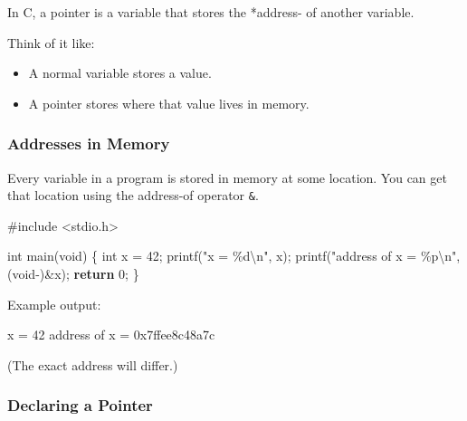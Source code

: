 \documentclass[
  letterpaper,
  DIV=11,
  numbers=noendperiod]{scrreprt}
\newenvironment{Shaded}{\begin{snugshade}}{\end{snugshade}}
\newcommand{\ControlFlowTok}[1]{\textcolor[rgb]{0.00,0.23,0.31}{\textbf{#1}}}
\newcommand{\DataTypeTok}[1]{\textcolor[rgb]{0.68,0.00,0.00}{#1}}
\newcommand{\DecValTok}[1]{\textcolor[rgb]{0.68,0.00,0.00}{#1}}
\newcommand{\ExtensionTok}[1]{\textcolor[rgb]{0.00,0.23,0.31}{#1}}
\newcommand{\ImportTok}[1]{\textcolor[rgb]{0.00,0.46,0.62}{#1}}
\newcommand{\NormalTok}[1]{\textcolor[rgb]{0.00,0.23,0.31}{#1}}
\newcommand{\OperatorTok}[1]{\textcolor[rgb]{0.37,0.37,0.37}{#1}}
\newcommand{\PreprocessorTok}[1]{\textcolor[rgb]{0.68,0.00,0.00}{#1}}
\newcommand{\SpecialCharTok}[1]{\textcolor[rgb]{0.37,0.37,0.37}{#1}}
\newcommand{\StringTok}[1]{\textcolor[rgb]{0.13,0.47,0.30}{#1}}
\providecommand{\tightlist}{%
  \setlength{\itemsep}{0pt}\setlength{\parskip}{0pt}}
\begin{document}
In C, a pointer is a variable that stores the *address- of another
variable.

Think of it like:

\begin{itemize}
\tightlist
\item
  A normal variable stores a value.
\item
  A pointer stores where that value lives in memory.
\end{itemize}

\subsubsection{Addresses in Memory}\label{addresses-in-memory}

Every variable in a program is stored in memory at some location. You
can get that location using the address-of operator \texttt{\&}.

\begin{Shaded}
\begin{Highlighting}[]
\PreprocessorTok{\#include }\ImportTok{\textless{}stdio.h\textgreater{}}

\DataTypeTok{int}\NormalTok{ main}\OperatorTok{(}\DataTypeTok{void}\OperatorTok{)} \OperatorTok{\{}
    \DataTypeTok{int}\NormalTok{ x }\OperatorTok{=} \DecValTok{42}\OperatorTok{;}
\NormalTok{    printf}\OperatorTok{(}\StringTok{"x = }\SpecialCharTok{\%d\textbackslash{}n}\StringTok{"}\OperatorTok{,}\NormalTok{ x}\OperatorTok{);}
\NormalTok{    printf}\OperatorTok{(}\StringTok{"address of x = }\SpecialCharTok{\%p\textbackslash{}n}\StringTok{"}\OperatorTok{,} \OperatorTok{(}\DataTypeTok{void}\OperatorTok{{-})\&}\NormalTok{x}\OperatorTok{);}
    \ControlFlowTok{return} \DecValTok{0}\OperatorTok{;}
\OperatorTok{\}}
\end{Highlighting}
\end{Shaded}

Example output:

\begin{Shaded}
\begin{Highlighting}[]
\ExtensionTok{x}\NormalTok{ = 42}
\ExtensionTok{address}\NormalTok{ of x = 0x7ffee8c48a7c}
\end{Highlighting}
\end{Shaded}

(The exact address will differ.)

\subsubsection{Declaring a Pointer}\label{declaring-a-pointer}
\end{document}
